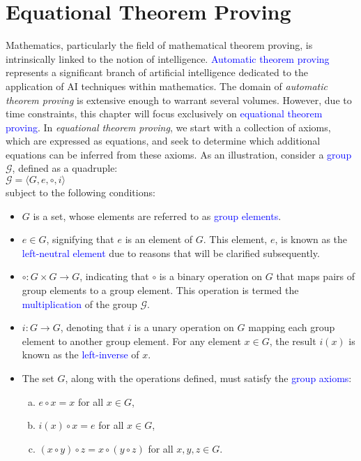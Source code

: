 \chapter{Equational Theorem Proving}
Mathematics, particularly the field of mathematical theorem proving, is intrinsically linked to the notion of intelligence. \textcolor{blue}{Automatic theorem proving} represents a significant branch of artificial intelligence dedicated to the application of AI techniques within mathematics. The domain of \emph{automatic theorem proving} is extensive enough to warrant several volumes. However, due to time constraints, this chapter will focus exclusively on \textcolor{blue}{equational theorem proving}. In \emph{equational theorem proving}, we start with a collection of axioms, which are expressed as equations, and seek to determine which additional equations can be inferred from these axioms. As an illustration, consider a \textcolor{blue}{group} $\mathcal{G}$, defined as a quadruple:
\\[0.2cm]
\hspace*{1.3cm}
$\mathcal{G} = \langle G, e, \circ, i \rangle$
\\[0.2cm]
subject to the following conditions:
\begin{itemize}
    \item $G$ is a set, whose elements are referred to as \textcolor{blue}{group elements}.
    \item $e \in G$, signifying that $e$ is an element of $G$. This element, $e$, is known as the
          \textcolor{blue}{left-neutral element} due to reasons that will be clarified subsequently. 
    \item $\circ: G \times G \rightarrow G$, indicating that $\circ$ is a binary operation on $G$ that maps
          pairs of group elements to a group element. This operation is termed the \textcolor{blue}{multiplication}
          of the group $\mathcal{G}$. 
    \item $i: G \rightarrow G$, denoting that $i$ is a unary operation on $G$ mapping each group element to
          another group element. For any element $x \in G$, the result $i(x)$ is known as the
          \textcolor{blue}{left-inverse} of $x$. 
    \item The set $G$, along with the operations defined, must satisfy the \textcolor{blue}{group axioms}:  
      \begin{enumerate}[(a)]
          \item $e \circ x = x$ for all $x \in G$,
          \item $i(x) \circ x = e$ for all $x \in G$,
          \item $(x \circ y) \circ z = x \circ (y \circ z)$ for all $x, y, z \in G$.
      \end{enumerate}
\end{itemize}
